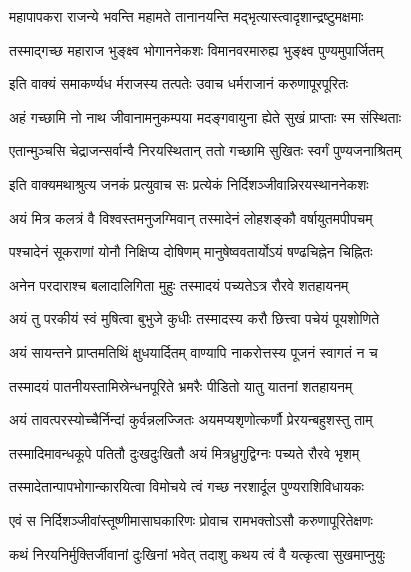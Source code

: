 \twolineshloka
{महापापकरा राजन्ये भवन्ति महामते}
{तानानयन्ति मद्भृत्यास्त्वादृशान्द्रष्टुमक्षमाः}%

\twolineshloka
{तस्माद्गच्छ महाराज भुङ्क्ष्व भोगाननेकशः}
{विमानवरमारुह्य भुङ्क्ष्व पुण्यमुपार्जितम्}%

\twolineshloka
{इति वाक्यं समाकर्ण्यध र्मराजस्य तत्पतेः}
{उवाच धर्मराजानं करुणापूरपूरितः}%


\twolineshloka
{अहं गच्छामि नो नाथ जीवानामनुकम्पया}
{मदङ्गवायुना ह्येते सुखं प्राप्ताः स्म संस्थिताः}%

\twolineshloka
{एतान्मुञ्चसि चेद्राजन्सर्वान्वै निरयस्थितान्}
{ततो गच्छामि सुखितः स्वर्गं पुण्यजनाश्रितम्}%


\twolineshloka
{इति वाक्यमथाश्रुत्य जनकं प्रत्युवाच सः}
{प्रत्येकं निर्दिशञ्जीवान्निरयस्थाननेकशः}%


\twolineshloka
{अयं मित्र कलत्रं वै विश्वस्तमनुजग्मिवान्}
{तस्मादेनं लोहशङ्कौ वर्षायुतमपीपचम्}%

\twolineshloka
{पश्चादेनं सूकराणां योनौ निक्षिप्य दोषिणम्}
{मानुषेष्ववतार्योऽयं षण्ढचिह्नेन चिह्नितः}%

\twolineshloka
{अनेन परदाराश्च बलादालिगिता मुहुः}
{तस्मादयं पच्यतेऽत्र रौरवे शतहायनम्}%

\twolineshloka
{अयं तु परकीयं स्वं मुषित्वा बुभुजे कुधीः}
{तस्मादस्य करौ छित्त्वा पचेयं पूयशोणिते}%

\twolineshloka
{अयं सायन्तने प्राप्तमतिथिं क्षुधयार्दितम्}
{वाण्यापि नाकरोत्तस्य पूजनं स्वागतं न च}%

\twolineshloka
{तस्मादयं पातनीयस्तामिस्रेन्धनपूरिते}
{भ्रमरैः पीडितो यातु यातनां शतहायनम्}%

\twolineshloka
{अयं तावत्परस्योच्चैर्निन्दां कुर्वन्नलज्जितः}
{अयमप्यशृणोत्कर्णौ प्रेरयन्बहुशस्तु ताम्}%

\twolineshloka
{तस्मादिमावन्धकूपे पतितौ दुःखदुःखितौ}
{अयं मित्रध्रुगुद्विग्नः पच्यते रौरवे भृशम्}%

\twolineshloka
{तस्मादेतान्पापभोगान्कारयित्वा विमोचये}
{त्वं गच्छ नरशार्दूल पुण्यराशिविधायकः}%


\twolineshloka
{एवं स निर्दिशञ्जीवांस्तूष्णीमासाघकारिणः}
{प्रोवाच रामभक्तोऽसौ करुणापूरितेक्षणः}%


\twolineshloka
{कथं निरयनिर्मुक्तिर्जीवानां दुःखिनां भवेत्}
{तदाशु कथय त्वं वै यत्कृत्वा सुखमाप्नुयुः}%

